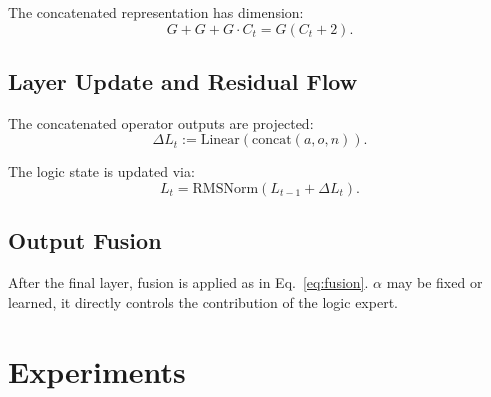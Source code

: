 \documentclass[10pt,twocolumn,letterpaper]{article}
\begin{document}
The concatenated representation has dimension:
\begin{equation}
G + G + G \cdot C_t = G(C_t + 2).
\end{equation}

\subsection{Layer Update and Residual Flow}

The concatenated operator outputs are projected:
\begin{equation}
\Delta L_t := \text{Linear}(\text{concat}(a, o, n)).
\end{equation}

The logic state is updated via:
\begin{equation}
L_t = \mathrm{RMSNorm}(L_{t-1} + \Delta L_t).
\end{equation}

\subsection{Output Fusion}

After the final layer, fusion is applied as in Eq.~\ref{eq:fusion}.
$\alpha$ may be fixed or learned, it directly controls
the contribution of the logic expert.

\section{Experiments}
\end{document}
